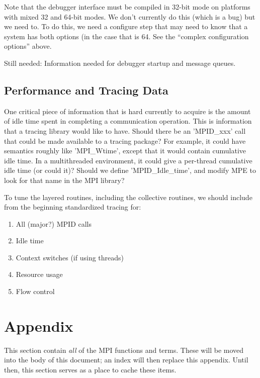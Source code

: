 \documentclass{article}
\begin{document}
Note that the debugger interface must be compiled in 32-bit mode on
platforms with mixed 32 and 64-bit modes.  We don't currently do this
(which is a bug) but we need to.  To do this, we need a configure step
that may need to know that a system has both options (in the case that
 is 64.  See the ``complex configuration
options'' above.

Still needed: Information needed for debugger startup and message
queues.

\subsection{Performance and Tracing Data}

One critical piece of information that is hard currently to acquire is
the amount of idle time spent in completing a communication operation.
This is information that a tracing library would like to have.  Should
there be an 'MPID_xxx' call that could be made available to a tracing
package?  For example, it could have semantics roughly like
'MPI_Wtime', except that it would contain cumulative idle time.  In a
multithreaded environment, it could give a per-thread cumulative idle
time (or could it)?  Should we define 'MPID_Idle_time', and modify MPE
to look for that name in the MPI library?

To tune the layered routines, including the collective routines, we
should include from the beginning standardized tracing for:
\begin{enumerate}
\item All (major?) MPID calls
\item Idle time
\item Context switches (if using threads)
\item Resource usage
\item Flow control
\end{enumerate}


\section{Appendix}
This section contain \emph{all} of the MPI functions and terms.  These
will be moved into the body of this document; an index will then
replace this appendix.  Until then, this section serves as a place to
cache these items.
\end{document}
